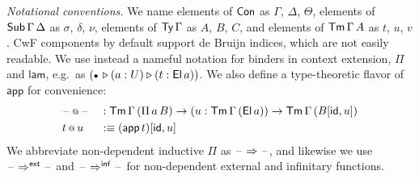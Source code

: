\documentclass[sigplan,review,anonymous]{acmart}\settopmatter{printfolios=true,printccs=false,printacmref=false}
\makeatletter
\newcommand{\ext}{\triangleright}
\newcommand{\emptycon}{\scaleobj{.75}\bullet}
\newcommand{\Pii}{\Pi}
\newcommand{\appi}{\mathsf{app}}
\newcommand{\lami}{\mathsf{lam}}
\newcommand{\Pie}{\Pi^{\mathsf{ext}}}
\newcommand{\Piinf}{\Pi^{\mathsf{inf}}}
\newcommand{\appitt}{\mathop{{\scriptstyle @}}}
\newcommand{\p}{\mathsf{p}}
\newcommand{\arri}{\Rightarrow}
\newcommand{\arre}{\Rightarrow^{\mathsf{ext}}}
\newcommand{\arrinf}{\Rightarrow^{\mathsf{inf}}}
\makeatother
\begin{document}
\emph{Notational conventions.} We name elements of $\mathsf{Con}$ as $\Gamma$, $\Delta$,
$\Theta$, elements of $\mathsf{Sub}\,\Gamma\,\Delta$ as $\sigma$, $\delta$, $\nu$,
elements of $\mathsf{Ty}\,\Gamma$ as $A$, $B$, $C$, and elements of $\mathsf{Tm}\,\Gamma\,A$ as
$t$, $u$, $v$. CwF components by default support de Bruijn indices, which are
not easily readable. We use instead a nameful notation for binders in context
extension, $\Pii$ and $\lami$, e.g.\ as $(\emptycon\,\ext (a : U) \ext (t :
\El\,a))$. We also define a type-theoretic flavor of $\appi$ for convenience:
\begin{alignat*}{3}
  & \blank\appitt\blank && :
      \Tm\,\Gamma\,(\Pii\,a\,B)\ra
      (u : \Tm\,\Gamma\,(\El\,a)) \ra \Tm\,\Gamma\,(B[\id, u])\\
  & t\appitt u && :\equiv (\appi\,t)[\id, u]
\end{alignat*}
We abbreviate non-dependent inductive $\Pii$ as $\blank\arri\blank$, and
likewise we use $\blank\arre\blank$ and $\blank\arrinf\blank$ for non-dependent
external and infinitary functions.

\end{document}
